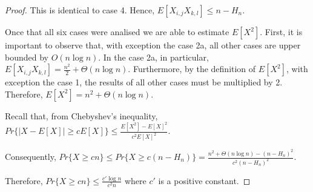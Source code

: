 \documentclass[12pt,letterpaper]{article}
\begin{document}
\begin{proof}
This is identical to case 4. Hence, $E[X_{i,j} X_{k,l}] \leq n - H_{n}$.


\vspace{0.5cm}


Once that all six cases were analised we are able to estimate $E[X^2]$.
First, it is important to observe that, with exception the case 2a, all other cases
are upper bounded by $O(n \log n)$. In the case 2a, in particular,
$E[X_{i,j} X_{k,l}] = \frac{n^2}{2} + \Theta(n \log n)$. Furthermore, by the definition of $E[X^2]$,
with exception the case 1, the results of all other cases must be multiplied by 2.
Therefore, $E[X^2] = n^2+ \Theta(n \log n)$.

Recall that, from Chebyshev's inequality, $Pr\{ |X - E[X]| \geq c E[X] \} \leq \frac{E[X^2] - E[X]^2}{c^2 E[X]^2}$.

Consequently, $Pr\{ X \geq c n \} \leq Pr\{ X \geq c (n - H_{n}) \} = \frac{n^2 + \Theta(n \log n) - (n - H_{n})^2}{c^2 (n - H_{n})^2}$.

Therefore, $Pr\{ X \geq c n \} \leq \frac{c' \log n}{c^2 n}$ where $c'$ is a positive constant.




\end{proof}

 
\end{document}
